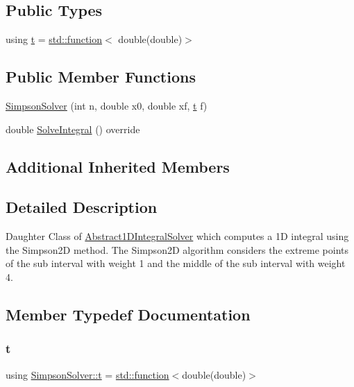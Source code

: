 \subsection*{Public Types}
\begin{DoxyCompactItemize}
\item 
using \hyperlink{class_simpson_solver_aa31ea3c884d669836ba1d0399aa53479}{t} = \hyperlink{_tests_8cpp_a1c2dbde1ba7d93e381d4ccb9f603be16}{std\+::function}$<$ double(double)$>$
\end{DoxyCompactItemize}
\subsection*{Public Member Functions}
\begin{DoxyCompactItemize}
\item 
\hyperlink{class_simpson_solver_abc9059969016bce44332013d48baeed2}{Simpson\+Solver} (int n, double x0, double xf, \hyperlink{class_abstract1_d_integral_solver_a7d8e60dfe7eb70e5c19dd71ac0b03880}{t} f)
\item 
double \hyperlink{class_simpson_solver_a4843e8bfc0344d9a9cae8688d1114667}{Solve\+Integral} () override
\end{DoxyCompactItemize}
\subsection*{Additional Inherited Members}


\subsection{Detailed Description}
Daughter Class of \hyperlink{class_abstract1_d_integral_solver}{Abstract1\+D\+Integral\+Solver} which computes a 1D integral using the Simpson2D method. The Simpson2D algorithm considers the extreme points of the sub interval with weight 1 and the middle of the sub interval with weight 4. 

\subsection{Member Typedef Documentation}
\mbox{\label{class_simpson_solver_aa31ea3c884d669836ba1d0399aa53479}} 
\subsubsection{\texorpdfstring{t}{t}}
{\footnotesize\ttfamily using \hyperlink{class_simpson_solver_aa31ea3c884d669836ba1d0399aa53479}{Simpson\+Solver\+::t} =  \hyperlink{_tests_8cpp_a1c2dbde1ba7d93e381d4ccb9f603be16}{std\+::function}$<$double(double)$>$}

